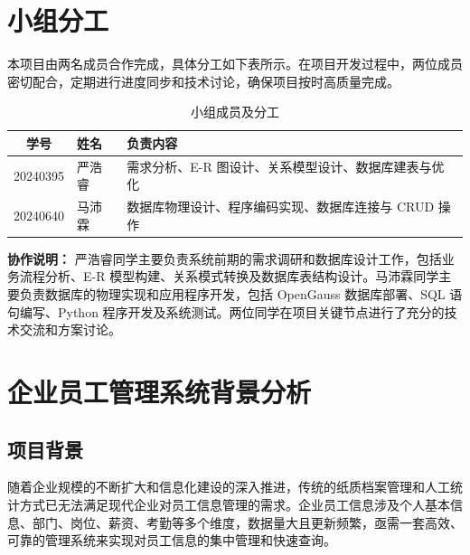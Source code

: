 \documentclass[12pt,a4paper]{article}
\begin{document}
\tableofcontents

\section*{小组分工}

本项目由两名成员合作完成，具体分工如下表所示。在项目开发过程中，两位成员密切配合，定期进行进度同步和技术讨论，确保项目按时高质量完成。

\begin{table}[htbp]
  \centering
  \caption{小组成员及分工}
  \renewcommand{\arraystretch}{1.5}
  \begin{tabular}{cl>{\raggedright\arraybackslash}p{7cm}}
    \toprule
    \textbf{学号} & \textbf{姓名} & \textbf{负责内容} \\
    \midrule
    20240395 & 严浩睿 & 需求分析、E-R 图设计、关系模型设计、数据库建表与优化 \\
    20240640 & 马沛霖 & 数据库物理设计、程序编码实现、数据库连接与 CRUD 操作 \\
    \bottomrule
  \end{tabular}
\end{table}

\textbf{协作说明：} 严浩睿同学主要负责系统前期的需求调研和数据库设计工作，包括业务流程分析、E-R 模型构建、关系模式转换及数据库表结构设计。马沛霖同学主要负责数据库的物理实现和应用程序开发，包括 OpenGauss 数据库部署、SQL 语句编写、Python 程序开发及系统测试。两位同学在项目关键节点进行了充分的技术交流和方案讨论。

\section{企业员工管理系统背景分析}

\subsection{项目背景}

随着企业规模的不断扩大和信息化建设的深入推进，传统的纸质档案管理和人工统计方式已无法满足现代企业对员工信息管理的需求。企业员工信息涉及个人基本信息、部门、岗位、薪资、考勤等多个维度，数据量大且更新频繁，亟需一套高效、可靠的管理系统来实现对员工信息的集中管理和快速查询。
\end{document}
